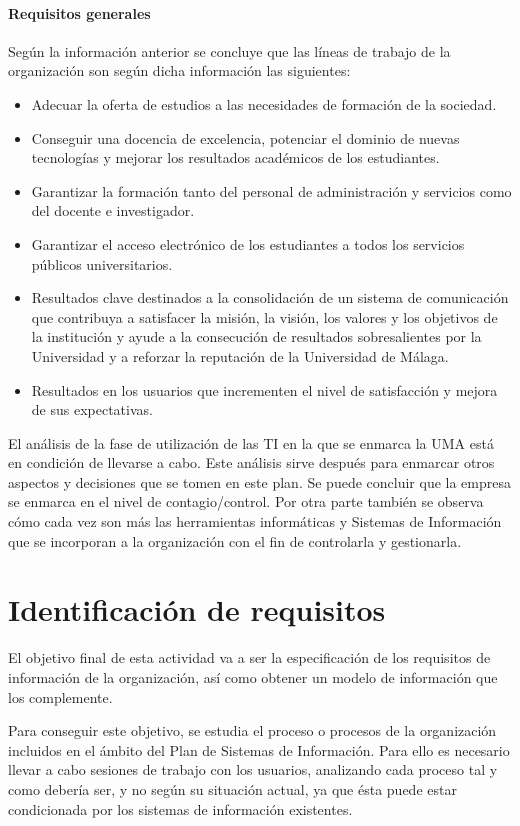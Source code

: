 \documentclass[11pt,a4paper,spanish,twoside]{report}
\begin{document}
\subsubsection{Requisitos generales}
Según la información anterior se concluye que las líneas de trabajo de
la organización son según dicha información las siguientes: 
\begin{itemize}
\item Adecuar la oferta de estudios a las necesidades de formación de la
  sociedad.
\item Conseguir una docencia de excelencia, potenciar el dominio de nuevas
  tecnologías y mejorar los resultados académicos de los estudiantes.
\item Garantizar la formación tanto del personal de administración y servicios
  como del docente e investigador.
\item Garantizar el acceso electrónico de los estudiantes a todos los servicios
  públicos universitarios.
\item Resultados clave destinados a la consolidación de un sistema de
  comunicación que contribuya a satisfacer la misión, la visión, los valores
  y los objetivos de la institución y ayude a la consecución de resultados
  sobresalientes por la Universidad y a reforzar la reputación de la
  Universidad de Málaga.
\item Resultados en los usuarios que incrementen el nivel de satisfacción y
  mejora de sus expectativas.
\end{itemize}
        
El análisis de la fase de utilización de las TI en la que se enmarca la 
UMA está en condición de llevarse a cabo. Este análisis sirve después
para enmarcar otros aspectos y decisiones que se tomen en este plan. Se puede
concluir que la empresa se enmarca en el nivel de contagio/control. Por
otra parte también se observa cómo cada vez son más las herramientas
informáticas y Sistemas de Información que se incorporan a la organización
con el fin de controlarla y gestionarla. 

\chapter{Identificación de requisitos}
El objetivo final de esta actividad va a ser la especificación de los
requisitos de información de la organización, así como obtener un modelo de
información que los complemente.

Para conseguir este objetivo, se estudia el proceso o procesos de la
organización incluidos en el ámbito del Plan de Sistemas de Información. Para
ello es necesario llevar a cabo sesiones de trabajo con los usuarios,
analizando cada proceso tal y como debería ser, y no según su situación
actual, ya que ésta puede estar condicionada por los sistemas de información
existentes. 
\end{document}
